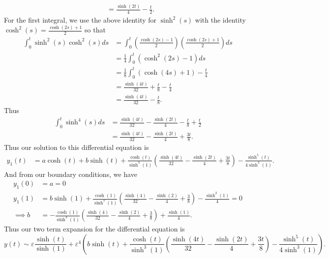 \documentclass{article}
\begin{document}
\begin{itemize}
\begin{itemize}
\begin{align*}
            &= \frac{\sinh(2t)}{4} - \frac{t}{2}.
        \end{align*}
        For the first integral, we use the above identity for $\sinh^2(s)$ with the identity $\cosh^2(s) = \frac{\cosh(2s) + 1}{2}$ so that
        \begin{align*}
            \int_0^t\sinh^2(s)\cosh^2(s)ds &= \int_0^t\left(\frac{\cosh(2s) - 1}{2}\right)\left(\frac{\cosh(2s) + 1}{2}\right)ds\\
            &= \frac{1}{4}\int_0^t (\cosh^2(2s) - 1)ds\\
            &= \frac{1}{8}\int_0^t(\cosh(4s) + 1) - \frac{t}{4}\\
            &= \frac{\sinh(4t)}{32} + \frac{t}{8} - \frac{t}{4}\\
            &= \frac{\sinh(4t)}{32} - \frac{t}{8}.
        \end{align*}
        Thus
        \begin{align*}
            \int_0^t\sinh^4(s)ds &= \frac{\sinh(4t)}{32}- \frac{\sinh(2t)}{4} - \frac{t}{8} + \frac{t}{2}\\
            &= \frac{\sinh(4t)}{32} - \frac{\sinh(2t)}{4} + \frac{3t}{8}.
        \end{align*}
        Thus our solution to this differential equation is
        \begin{align*}
            y_1(t) &= a\cosh(t) + b\sinh(t) + \frac{\cosh(t)}{\sinh^3(1)}\left(\frac{\sinh(4t)}{32} - \frac{\sinh(2t)}{4} + \frac{3t}{8}\right) - \frac{\sinh^5(t)}{4\sinh^3(1)}.
        \end{align*}
        And from our boundary conditions, we have
        \begin{align*}
            y_1(0) &= a = 0\\
            y_1(1) &= b\sinh(1) + \frac{\cosh(1)}{\sinh^3(1)}\left(\frac{\sinh(4)}{32} - \frac{\sinh(2)}{4} + \frac{3}{8}\right) - \frac{\sinh^2(1)}{4} = 0\\
            \implies b &=  - \frac{\cosh(1)}{\sinh^4(1)}\left(\frac{\sinh(4)}{32} - \frac{\sinh(2)}{4} + \frac{3}{8}\right) + \frac{\sinh(1)}{4}.
        \end{align*}
        Thus our two term expansion for the differential equation is
        \[y(t) \sim \varepsilon\frac{\sinh(t)}{\sinh(1)} + \varepsilon^4\left(b\sinh(t) + \frac{\cosh(t)}{\sinh^3(1)}\left(\frac{\sinh(4t)}{32} - \frac{\sinh(2t)}{4} + \frac{3t}{8}\right) - \frac{\sinh^5(t)}{4\sinh^3(1)}\right).\]
    \end{itemize}


\end{itemize}
\end{document}
